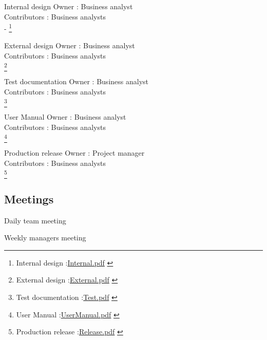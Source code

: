 \documentclass[8pt]{beamer}
\begin{document}
\begin{frame}{Internal design}
Owner : Business analyst\\
Contributors : Business analysts\\
- 
\footnote{
\footnotesize{
\tiny{Internal design :\url{Internal.pdf} }}
}
\end{frame}

\begin{frame}{External design}
Owner : Business analyst\\
Contributors : Business analysts\\
\footnote{
\footnotesize{
\tiny{External design :\url{External.pdf} }}
}
\end{frame}

\begin{frame}{Test documentation}
Owner : Business analyst\\
Contributors : Business analysts\\
\footnote{
\footnotesize{
\tiny{Test documentation :\url{Test.pdf} }}
}
\end{frame}

\begin{frame}{User Manual}
Owner : Business analyst\\
Contributors : Business analysts\\
\footnote{
\footnotesize{
\tiny{User Manual :\url{UserManual.pdf} }}
}
\end{frame}

\begin{frame}{Production release}
Owner : Project manager\\
Contributors : Business analysts\\
\footnote{
\footnotesize{
\tiny{Production release :\url{Release.pdf} }}
}
\end{frame}

\subsection{Meetings}

\begin{frame}{Daily team meeting}
\end{frame}
\begin{frame}{Weekly managers meeting}
\end{frame}
\end{document}
